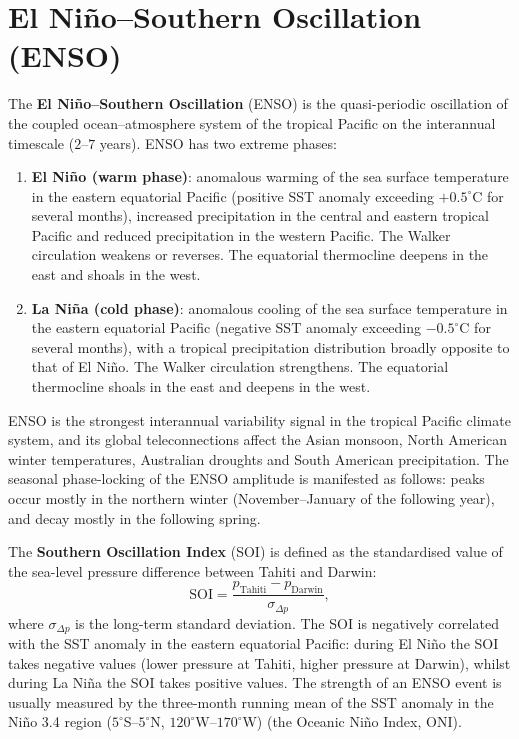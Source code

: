 \section{El Niño--Southern Oscillation (ENSO)}

\begin{definition}\label{def:enso}
The \textbf{El Niño--Southern Oscillation} (ENSO) is the quasi-periodic oscillation of the coupled ocean--atmosphere system of the tropical Pacific on the interannual timescale ($2$--$7$ years). ENSO has two extreme phases:
\begin{enumerate}[label=(\roman*)]
    \item \textbf{El Niño (warm phase)}: anomalous warming of the sea surface temperature in the eastern equatorial Pacific (positive SST anomaly exceeding $+0.5^\circ$C for several months), increased precipitation in the central and eastern tropical Pacific and reduced precipitation in the western Pacific. The Walker circulation weakens or reverses. The equatorial thermocline deepens in the east and shoals in the west.
    \item \textbf{La Niña (cold phase)}: anomalous cooling of the sea surface temperature in the eastern equatorial Pacific (negative SST anomaly exceeding $-0.5^\circ$C for several months), with a tropical precipitation distribution broadly opposite to that of El Niño. The Walker circulation strengthens. The equatorial thermocline shoals in the east and deepens in the west.
\end{enumerate}
ENSO is the strongest interannual variability signal in the tropical Pacific climate system, and its global teleconnections affect the Asian monsoon, North American winter temperatures, Australian droughts and South American precipitation. The seasonal phase-locking of the ENSO amplitude is manifested as follows: peaks occur mostly in the northern winter (November--January of the following year), and decay mostly in the following spring.
\end{definition}

\begin{definition}\label{def:soi}
The \textbf{Southern Oscillation Index} (SOI) is defined as the standardised value of the sea-level pressure difference between Tahiti and Darwin:
\[
\text{SOI} = \frac{p_{\text{Tahiti}} - p_{\text{Darwin}}}{\sigma_{\Delta p}},
\]
where $\sigma_{\Delta p}$ is the long-term standard deviation. The SOI is negatively correlated with the SST anomaly in the eastern equatorial Pacific: during El Niño the SOI takes negative values (lower pressure at Tahiti, higher pressure at Darwin), whilst during La Niña the SOI takes positive values. The strength of an ENSO event is usually measured by the three-month running mean of the SST anomaly in the Niño 3.4 region ($5^\circ$S--$5^\circ$N, $120^\circ$W--$170^\circ$W) (the Oceanic Niño Index, ONI).
\end{definition}

